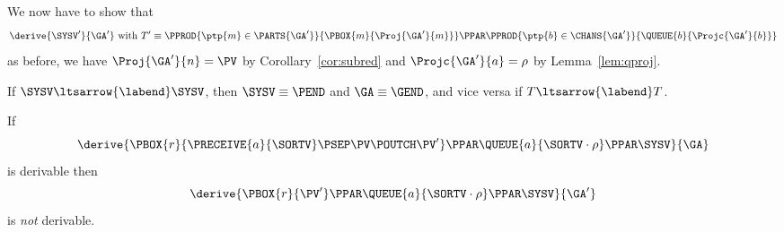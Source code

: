 We now have to show that
\begin{equation}
  \label{eq:corr23}
  \derive{\SYSV'}{\GA'}
  \text{ with }
  T' \equiv
  \PPROD{\ptp{m} \in \PARTS{\GA'}}{\PBOX{m}{\Proj{\GA'}{m}}} \PPAR
  \PPROD{\ptp{b} \in \CHANS{\GA'}}{\QUEUE{b}{\Projc{\GA'}{b}}}
\end{equation}
as before, we have $\Proj{\GA'}{n} = \PV$ by Corollary~\ref{cor:subred} and
$\Projc{\GA'}{a} = \rho$ by Lemma~\ref{lem:qproj}.

If $\SYSV \ltsarrow{\labend} \SYSV$, then $\SYSV \equiv \PEND$ and $\GA \equiv \GEND$,
and vice versa if  $T \ltsarrow{\labend} T$.


\begin{lemma}\label{lem:qbranch}

  If 
  \[
  \derive{
    \PBOX{r}{\PRECEIVE{a}{\SORTV} \PSEP \PV \POUTCH \PV'} \PPAR 
    \QUEUE{a}{\SORTV \cdot \rho} \PPAR
    \SYSV}{\GA}
  \]
  is derivable then
  \[
  \derive{\PBOX{r}{\PV'} \PPAR 
    \QUEUE{a}{\SORTV \cdot \rho}\PPAR
    \SYSV}{\GA'}
  \] is \emph{not} derivable.
\end{lemma}


